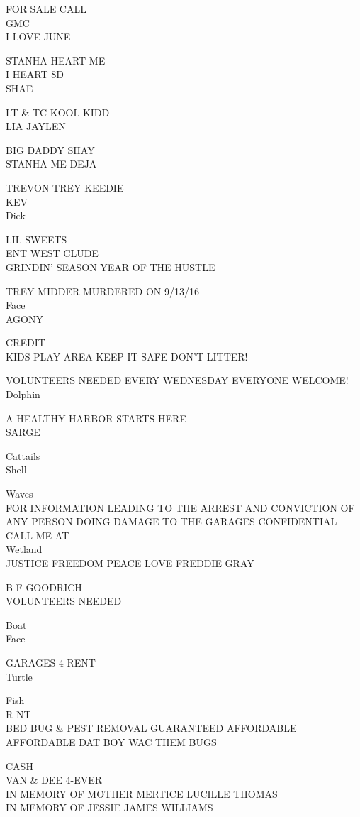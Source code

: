 \documentclass[10pt,letterpaper]{article}
\begin{document}
FOR SALE CALL\\
GMC\\
I LOVE JUNE

STANHA HEART ME\\
I HEART 8D\\
SHAE

LT \& TC KOOL KIDD\\
LIA JAYLEN

BIG DADDY SHAY\\
STANHA ME DEJA

TREVON TREY KEEDIE\\
KEV\\
Dick

LIL SWEETS\\
ENT WEST CLUDE\\
GRINDIN' SEASON YEAR OF THE HUSTLE

TREY MIDDER MURDERED ON 9/13/16\\
Face\\
AGONY

CREDIT\\
KIDS PLAY AREA KEEP IT SAFE DON'T LITTER!

VOLUNTEERS NEEDED EVERY WEDNESDAY EVERYONE WELCOME!\\
Dolphin

A HEALTHY HARBOR STARTS HERE\\
SARGE

Cattails\\
Shell

Waves\\
FOR INFORMATION LEADING TO THE ARREST AND CONVICTION OF ANY PERSON DOING DAMAGE TO THE GARAGES CONFIDENTIAL CALL ME AT\\
Wetland\\
JUSTICE FREEDOM PEACE LOVE FREDDIE GRAY

B F GOODRICH\\
VOLUNTEERS NEEDED

Boat\\
Face

GARAGES 4 RENT\\
Turtle

Fish\\
R NT\\
BED BUG \& PEST REMOVAL GUARANTEED AFFORDABLE AFFORDABLE DAT BOY WAC THEM BUGS

CASH\\
VAN \& DEE 4{-}EVER\\
IN MEMORY OF MOTHER MERTICE LUCILLE THOMAS\\
IN MEMORY OF JESSIE JAMES WILLIAMS
\end{document}
